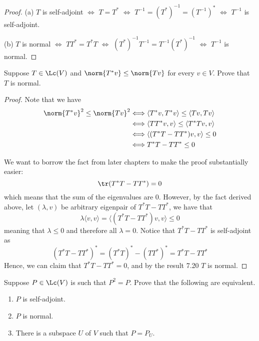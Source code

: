\documentclass{extarticle}
\begin{document}
\begin{proof}
(a) \(T\) is self-adjoint \(\Longleftrightarrow\) \(T = T^*\) \(\Longleftrightarrow\) \(T^{-1} = (T^*)^{-1} = (T^{-1})^*\)
\(\Longleftrightarrow\) \(T^{-1}\) is self-adjoint.

(b) \(T\) is normal \(\Longleftrightarrow\) \(TT^* = T^*T\) \(\Longleftrightarrow\)
\((T^*)^{-1}T^{-1} = T^{-1}(T^*)^{-1}\) \(\Longleftrightarrow\) \(T^{-1}\) is normal.
\end{proof}

\begin{problem}{19}
    Suppose \(T \in \Lc(V)\) and \(\norm{T^* v} \leq \norm{Tv}\) for every \(v \in V\). Prove that
    \(T\) is normal.
\end{problem}

\begin{proof}

Note that we have
\begin{align*}
    \norm{T^* v}^2 \leq \norm{T v}^2
    &\Longleftrightarrow \langle T^*v,T^* v \rangle \leq \langle Tv,Tv \rangle \\
    &\Longleftrightarrow \langle TT^*v,v \rangle \leq \langle T^* Tv,v \rangle \\
    &\Longleftrightarrow \langle (T^*T - TT^*)v,v \rangle \leq 0 \\
    &\Longleftrightarrow T^* T - TT^* \leq 0
\end{align*}

We want to borrow the fact from later chapters to make the proof substantially easier:
\[\tr(T^* T - TT^*) = 0 \]
which means that the sum of the eigenvalues are 0. However, by the fact derived above, let
\((\lambda, v)\) be arbitrary eigenpair of \(T^* T - TT^*\), we have that
\[\lambda \langle v,v \rangle = \langle (T^* T - TT^* )v,v \rangle \leq 0\]
meaning that \(\lambda \leq 0\) and therefore all \(\lambda = 0\). Notice that
\(T^*T - TT^*\) is self-adjoint as
\[(T^*T - TT^*)^* = (T^* T)^* - (TT^*)^* = T^* T - TT^*\]
Hence, we can claim that \(T^* T - TT^* = 0\), and by the result 7.20 \(T\) is normal.
\end{proof}

\begin{problem}{20}
    Suppose \(P \in \Lc(V)\) is such that \(P^2 = P\). Prove that the following are equivalent.
    \begin{enumerate}[label=(\alph*)]
        \item \(P\) is self-adjoint.
        \item \(P\) is normal.
        \item There is a subspace \(U\) of \(V\) such that \(P = P_U\).
    \end{enumerate}
\end{problem}
\end{document}
